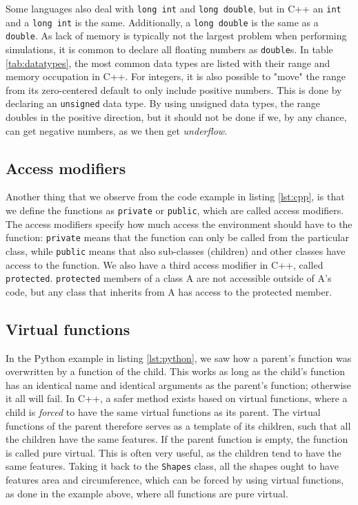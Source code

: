 Some languages also deal with \texttt{long int} and \texttt{long double}, but in C++ an \texttt{int} and a \texttt{long int} is the same. Additionally, a \texttt{long double} is the same as a \texttt{double}. As lack of memory is typically not the largest problem when performing simulations, it is common to declare all floating numbers as \texttt{double}s. In table \eqref{tab:datatypes}, the most common data types are listed with their range and memory occupation in C++. For integers, it is also possible to "move" the range from its zero-centered default to only include positive numbers. This is done by declaring an \texttt{unsigned} data type. By using unsigned data types, the range doubles in the positive direction, but it should not be done if we, by any chance, can get negative numbers, as we then get \textit{underflow}.  

\subsection{Access modifiers}
Another thing that we observe from the code example in listing \eqref{lst:cpp}, is that we define the functions as \texttt{private} or \texttt{public}, which are called access modifiers. The access modifiers specify how much access the environment should have to the function: \texttt{private} means that the function can only be called from the particular class, while \texttt{public} means that also sub-classes (children) and other classes have access to the function. We also have a third access modifier in C++, called \texttt{protected}. \texttt{protected} members of a class A are not accessible outside of A's code, but any class that inherits from A has access to the protected member. 

\subsection{Virtual functions}
In the Python example in listing \eqref{lst:python}, we saw how a parent's function was overwritten by a function of the child. This works as long as the child's function has an identical name and identical arguments as the parent's function; otherwise it all will fail. In C++, a safer method exists based on virtual functions, where a child is \textit{forced} to have the same virtual functions as its parent. The virtual functions of the parent therefore serves as a template of its children, such that all the children have the same features. If the parent function is empty, the function is called pure virtual. This is often very useful, as the children tend to have the same features. Taking it back to the \texttt{Shapes} class, all the shapes ought to have features area and circumference, which can be forced by using virtual functions, as done in the example above, where all functions are pure virtual.

